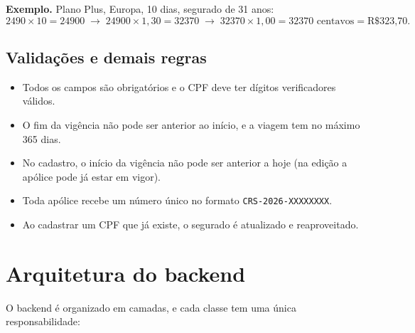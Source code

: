 \documentclass[11pt,a4paper]{article}
\begin{document}
\textbf{Exemplo.} Plano Plus, Europa, 10 dias, segurado de 31 anos:
\[
  2490 \times 10 = 24900 \;\rightarrow\; 24900 \times 1{,}30 = 32370 \;\rightarrow\; 32370 \times 1{,}00 = 32370
  \text{ centavos} = \text{R\$ 323,70}.
\]

\subsection{Validações e demais regras}

\begin{itemize}
  \item Todos os campos são obrigatórios e o CPF deve ter dígitos verificadores válidos.
  \item O fim da vigência não pode ser anterior ao início, e a viagem tem no máximo 365 dias.
  \item No cadastro, o início da vigência não pode ser anterior a hoje (na edição a apólice pode já estar em vigor).
  \item Toda apólice recebe um número único no formato \texttt{CRS-2026-XXXXXXXX}.
  \item Ao cadastrar um CPF que já existe, o segurado é atualizado e reaproveitado.
\end{itemize}

\section{Arquitetura do backend}

O backend é organizado em camadas, e cada classe tem uma única responsabilidade:

\begin{center}
\end{center}
\end{document}
